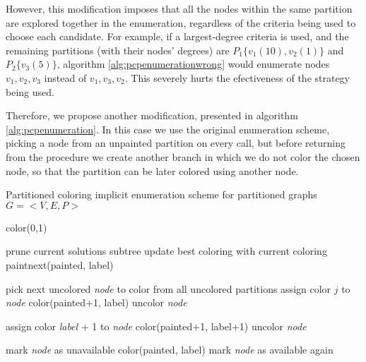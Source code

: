 However, this modification imposes that all the nodes within the same partition are explored together in the enumeration, regardless of the criteria being used to choose each candidate. For example, if a largest-degree criteria is used, and the remaining partitions (with their nodes' degrees) are $P_1 \{v_1(10),v_2(1)\}$ and $P_2 \{v_3(5)\}$, algorithm \ref{alg:pcpenumerationwrong} would enumerate nodes $v_1, v_2, v_3$ instead of $v_1, v_3, v_2$. This severely hurts the efectiveness of the strategy being used.

Therefore, we propose another modification, presented in algorithm \ref{alg:pcpenumeration}. In this case we use the original enumeration scheme, picking a node from an unpainted partition on every call, but before returning from the procedure we create another branch in which we do not color the chosen node, so that the partition can be later colored using another node.

\begin{algorithm}
\caption{Partitioned coloring implicit enumeration scheme for partitioned graphs $G = <V,E,P>$}
\label{alg:pcpenumeration}

\begin{algorithmic}
\CALL color(0,1)

		\STATE prune current solutions subtree
		\STATE update best coloring with current coloring
	\ELSE
		\CALL paintnext(painted, label)
	\ENDIF
\ENDPROC

		\STATE pick next uncolored \textit{node} to color	from all uncolored partitions	
				\STATE assign color $j$ to \textit{node}
				\CALL color(painted+1, label)
				\STATE uncolor \textit{node}
			\ENDIF
		\ENDFOR
		
		\STATE assign color \textit{label} + 1 to \textit{node}
		\CALL color(painted+1, label+1)
		\STATE uncolor \textit{node}
		
			\STATE mark \textit{node} as unavailable
			\CALL color(painted, label)
			\STATE mark \textit{node} as available again
		\ENDIF
		
\ENDPROC

\end{algorithmic}
\end{algorithm}

